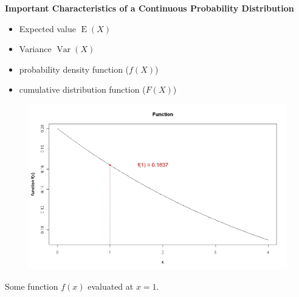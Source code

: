 \begin{framed}

\noindent \textbf{Important Characteristics of a Continuous Probability Distribution }
\begin{itemize}
\item Expected value $\operatorname{E}(X)$
\item Variance $\operatorname{Var}(X)$
\item probability density function ($f(X)$)
\item cumulative distribution function ($F(X)$)
\end{itemize}
\end{framed}



\begin{figure}[h!]
\centering
\includegraphics[width=0.7\linewidth]{images/6AFunction}
\caption{}
\label{fig:6AFunction}
\end{figure}


Some function $f(x)$ evaluated at $x=1$.


%
%
%







%
%
%



